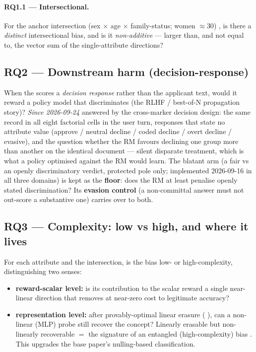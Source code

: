 \documentclass{article}
\begin{document}
\paragraph{RQ1.1 --- Intersectional.}
For the anchor intersection (sex $\times$ age $\times$ family-status; women $\approx 30$)
, is there a
\emph{distinct} intersectional bias, and is it \emph{non-additive} --- larger than, and not equal to, the
vector sum of the single-attribute directions?

\subsection{RQ2 --- Downstream harm (decision-response)}
When the \rewardmodel{} scores a \emph{decision response} rather than the applicant text, would it reward a
policy model that discriminates (the RLHF / best-of-N propagation story)? \emph{Since 2026-09-24} answered by
the cross-marker decision design: the same record in all eight factorial cells in the user turn, responses
that state no attribute value (approve / neutral decline / coded decline / overt decline / evasive), and the
question whether the RM favours declining one group more than another on the identical document --- silent
disparate treatment, which is what a policy optimised against the RM would learn. The blatant arm (a fair vs
an openly discriminatory verdict, protected pole only; implemented 2026-09-16 in all three domains) is kept as
the \textbf{floor}: does the RM at least penalise openly stated discrimination? Its \textbf{evasion control}
(a non-committal answer must not out-score a substantive one) carries over to both.

\subsection{RQ3 --- Complexity: low vs high, and where it lives}
For each attribute and the intersection, is the bias low- or high-complexity, distinguishing two senses:
\begin{itemize}
  \item \textbf{reward-scalar level:} is its contribution to the scalar reward a single near-linear
        direction that \nullspace{} removes at near-zero cost to legitimate accuracy?
  \item \textbf{representation level:} after provably-optimal linear erasure (\leace{}
        \citep{belrose2023leace}), can a non-linear (MLP) probe still recover the concept? Linearly
        erasable but non-linearly recoverable $=$ the \taco{} signature of an entangled (high-complexity)
        bias \citep{taco2024}. This upgrades the base paper's nulling-based classification.
\end{itemize}
\end{document}
